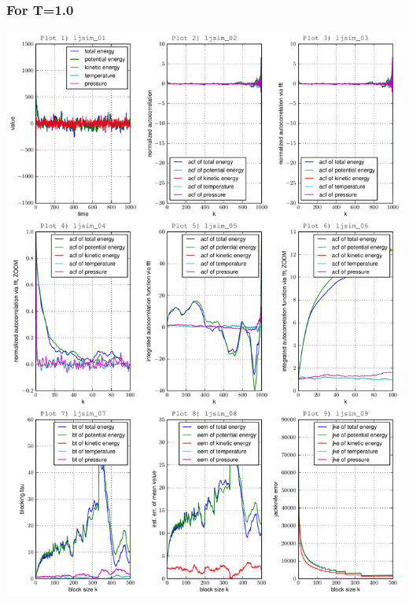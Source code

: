 \documentclass[12pt,a4paper]{scrartcl}
\begin{document}
\subsubsection*{For T=1.0}
\includegraphics[page=1, scale=0.63]{../plots/error10}
\end{document}

